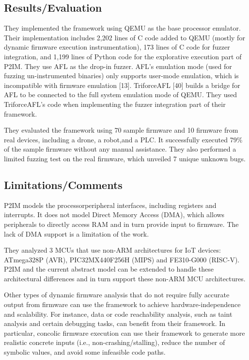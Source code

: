 \subsection{Results/Evaluation}
They implemented the framework using QEMU as the base processor emulator. Their implementation includes 2,202 lines of C code added to QEMU (mostly for dynamic firmware execution instrumentation), 173 lines of C code for fuzzer integration, and 1,199 lines of Python code for the explorative execution part of P2IM. They use AFL as the drop-in fuzzer.  AFL’s emulation mode (used for fuzzing un-instrumented binaries) only supports user-mode emulation, which is incompatible with firmware emulation [13]. TriforceAFL [40] builds a bridge for AFL to be connected to the full system emulation mode of QEMU. They used TriforceAFL’s code when implementing the fuzzer integration part of their framework.

They evaluated the framework using 70 sample firmware and 10 firmware from real devices, including a drone, a robot,and a PLC. It successfully executed 79\% of the sample firmware without any manual assistance. They also performed a limited fuzzing test on the real firmware, which unveiled 7 unique unknown bugs.
\subsection{Limitations/Comments}
P2IM models the processorperipheral interfaces, including registers and interrupts. It does not model Direct Memory Access (DMA), which allows peripherals to directly access RAM and in turn provide input to firmware. The lack of DMA support is a limitation of the work.

They analyzed 3 MCUs that use non-ARM architectures for IoT devices: ATmega328P (AVR), PIC32MX440F256H (MIPS) and FE310-G000 (RISC-V).  P2IM and the current abstract model can be extended to handle these architectural differences and in turn support these non-ARM MCU architectures.

Other types of dynamic firmware analysis that do not require fully accurate output from firmware can use the framework to achieve hardware-independence and scalability. For instance, data or code reachability analysis, such as taint analysis and certain debugging tasks, can benefit from their framework. In particular, concolic firmware execution can use their framework to generate more realistic concrete inputs (i.e., non-crashing/stalling), reduce the number of symbolic values, and avoid some infeasible code paths.
\newpage
